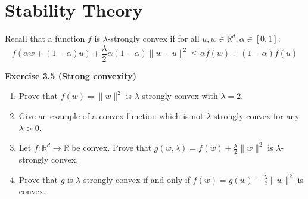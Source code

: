 \documentclass[
	10pt, %
	a4paper, %
	oneside, %
	headinclude,footinclude, %
	BCOR5mm, %
]{scrartcl}
\newenvironment{problem}[2][]
{ \begin{mdframed}[backgroundcolor=gray!20] \textbf{#1 #2} \\}
		{  \end{mdframed}}
\begin{document}
\section*{Stability Theory}
Recall that a function $f$ is $\lambda$-strongly convex if for all $u, w \in \mathbb{R}^d , \alpha \in [0, 1]$:
\[f(\alpha w + (1 - \alpha)u) + \frac{\lambda}{2} \alpha(1 - \alpha)\|w - u\|^2 \leq \alpha f(w) + (1 - \alpha)f(u)\]
\begin{problem}{Exercise 3.5 (Strong convexity)}
\begin{enumerate}[label= (\alph*)]
	\item Prove that $f(w) = \|w\|^2$ is $\lambda$-strongly convex with $\lambda = 2$.
	\item Give an example of a convex function which is not $\lambda$-strongly convex for any $\lambda > 0$.
	\item Let $f : \mathbb{R}^d \rightarrow \mathbb{R}$ be convex. Prove that $g(w, \lambda) = f(w) + \frac{\lambda}{2}\|w\|^2$ is $\lambda$-strongly convex.
	\item Prove that $g$ is $\lambda$-strongly convex if and only if $f(w) = g(w) - \frac{\lambda}{2}\|w\|^2$ is convex.
\end{enumerate}
\end{problem}
\end{document}

